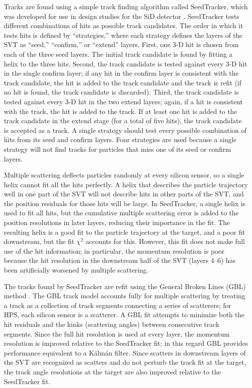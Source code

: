 Tracks are found using a simple track finding algorithm called SeedTracker, which was developed for use in design studies for the SiD detector \cite{partridge_seed-based_2006}.
SeedTracker tests different combinations of hits as possible track candidates.
The order in which it tests hits is defined by ``strategies,'' where each strategy defines the layers of the SVT as ``seed,'' ``confirm,'' or ``extend'' layers.
First, one 3-D hit is chosen from each of the three seed layers.
The initial track candidate is found by fitting a helix to the three hits.
Second, the track candidate is tested against every 3-D hit in the single confirm layer; if any hit in the confirm layer is consistent with the track candidate, the hit is added to the track candidate and the track is refit (if no hit is found, the track candidate is discarded).
Third, the track candidate is tested against every 3-D hit in the two extend layers; again, if a hit is consistent with the track, the hit is added to the track.
If at least one hit is added to the track candidate in the extend stage (for a total of five hits), the track candidate is accepted as a track.
A single strategy should test every possible combination of hits from its seed and confirm layers.
Four strategies are used because a single strategy will not find tracks for particles that miss one of its seed or confirm layers.

Multiple scattering deflects particles randomly at every silicon sensor, so a single helix cannot fit all the hits perfectly.
A helix that describes the particle trajectory well in one part of the SVT will not describe hits in other parts of the SVT, and the position residuals for those hits will be large.
In SeedTracker, a single helix is used to fit all hits, but the cumulative multiple scattering error is added to the position resolutions in later layers, reducing their importance in the fit.
The resulting helix is a good fit to the particle trajectory at the target, and a poor fit downstream, but the fit $\chi^2$ accounts for this.
However, this fit does not make full use of the hit information; in particular, the momentum resolution is poor because the hit resolution in the downstream half of the SVT (layers 4--6) has been artificially worsened by multiple scattering.

The tracks found by SeedTracker are refit using the General Broken Lines (GBL) method \cite{blobel_new_2006, kleinwort_general_2012}.
The GBL track model accounts fully for multiple scattering by treating a track as a collection of track segments connecting a series of scatterers; for HPS, each silicon sensor is a scatterer.
A GBL fit attempts to minimize both the hit residuals and the kinks (scattering angles) between consecutive track segments.
Since the full hit resolution is used at every layer, the momentum resolution is improved relative to the SeedTracker fit; in this regard GBL provides performance equivalent to a K\'alm\'an filter.
Since scatters in downstream layers of the SVT are recognized as scatters and do not perturb the track fit at the target, the track angle resolutions at the target are also improved relative to the SeedTracker fit.

